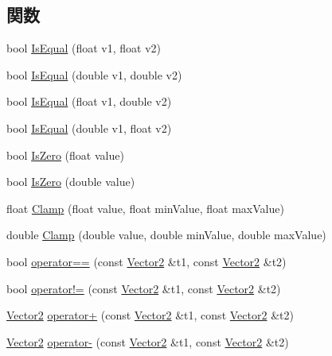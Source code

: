 \subsection*{関数}
\begin{DoxyCompactItemize}
\item 
bool \mbox{\hyperlink{namespace_math_a622cf93fd441b31963159cb086b01ff4}{Is\+Equal}} (float v1, float v2)
\item 
bool \mbox{\hyperlink{namespace_math_a298771bf90fda8152d34b6fd004d1c7f}{Is\+Equal}} (double v1, double v2)
\item 
bool \mbox{\hyperlink{namespace_math_aa9851c5508417d12ef139ebbe943f6a7}{Is\+Equal}} (float v1, double v2)
\item 
bool \mbox{\hyperlink{namespace_math_a5eeb1781896881768b92899090b7d750}{Is\+Equal}} (double v1, float v2)
\item 
bool \mbox{\hyperlink{namespace_math_aa85ef15b6a4171111a31bb17db917dd9}{Is\+Zero}} (float value)
\item 
bool \mbox{\hyperlink{namespace_math_a50e4a54ad68fe1c946ba6b5c425e47ad}{Is\+Zero}} (double value)
\item 
float \mbox{\hyperlink{namespace_math_a63a182d010a122c2bf2332d080682068}{Clamp}} (float value, float min\+Value, float max\+Value)
\item 
double \mbox{\hyperlink{namespace_math_a9e59da084cd78b8cd7bc184931280f62}{Clamp}} (double value, double min\+Value, double max\+Value)
\item 
bool \mbox{\hyperlink{namespace_math_af4687bc70508587a7473bab655a2b2a9}{operator==}} (const \mbox{\hyperlink{struct_math_1_1_vector2}{Vector2}} \&t1, const \mbox{\hyperlink{struct_math_1_1_vector2}{Vector2}} \&t2)
\item 
bool \mbox{\hyperlink{namespace_math_a248dfe0b65dce8c8f25689145d18fc68}{operator!=}} (const \mbox{\hyperlink{struct_math_1_1_vector2}{Vector2}} \&t1, const \mbox{\hyperlink{struct_math_1_1_vector2}{Vector2}} \&t2)
\item 
\mbox{\hyperlink{struct_math_1_1_vector2}{Vector2}} \mbox{\hyperlink{namespace_math_a62f686c8f0b005ab24cd368fe4ab1b4b}{operator+}} (const \mbox{\hyperlink{struct_math_1_1_vector2}{Vector2}} \&t1, const \mbox{\hyperlink{struct_math_1_1_vector2}{Vector2}} \&t2)
\item 
\mbox{\hyperlink{struct_math_1_1_vector2}{Vector2}} \mbox{\hyperlink{namespace_math_a3c1ebbbebd6020556b1cdd7ebe1ee1a5}{operator-\/}} (const \mbox{\hyperlink{struct_math_1_1_vector2}{Vector2}} \&t1, const \mbox{\hyperlink{struct_math_1_1_vector2}{Vector2}} \&t2)

\end{DoxyCompactItemize}
